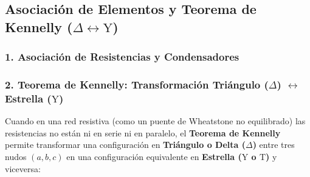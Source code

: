 \subsection{Asociación de Elementos y Teorema de Kennelly ($\Delta \leftrightarrow \text{Y}$)}

\subsubsection{1. Asociación de Resistencias y Condensadores}
\begin{table}[H]
\centering
\renewcommand{\arraystretch}{1.5}
\caption{Reglas de asociación equivalente de resistencias, condensadores y fuentes ideales.}
\end{table}

\subsubsection{2. Teorema de Kennelly: Transformación Triángulo ($\Delta$) $\leftrightarrow$ Estrella ($\text{Y}$)}
Cuando en una red resistiva (como un puente de Wheatstone no equilibrado) las resistencias no están ni en serie ni en paralelo, el \textbf{Teorema de Kennelly} permite transformar una configuración en \textbf{Triángulo o Delta ($\Delta$)} entre tres nudos $(a, b, c)$ en una configuración equivalente en \textbf{Estrella ($\text{Y}$ o $\text{T}$)} y viceversa:


